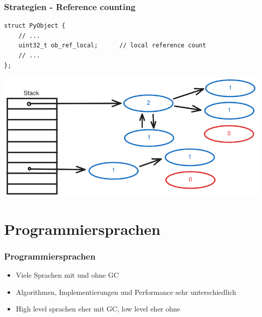 \documentclass{beamer}
\begin{document}
            \begin{frame}[fragile]
                \frametitle{Strategien - Reference counting}

                    \begin{verbatim}
struct PyObject {
    // ...
    uint32_t ob_ref_local;      // local reference count
    // ...
};
                    \end{verbatim}

                \includegraphics[width=\textwidth]{images/Reference-counting.png}
            \end{frame}


    \section{Programmiersprachen}
        \begin{frame}
            \frametitle{Programmiersprachen}

            \begin{itemize}
                \item Viele Sprachen mit und ohne GC
                \item Algorithmen, Implementierungen und Performance sehr unterschiedlich
                \item High level sprachen eher mit GC, low level eher ohne
            \end{itemize}
        \end{frame}
\end{document}
